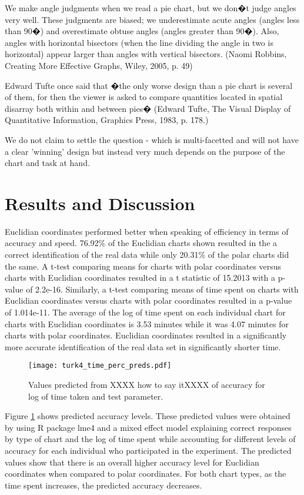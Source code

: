 	
	We make angle judgments when we read a pie chart, but we don�t judge angles very well. These judgments are biased; we underestimate acute angles (angles less than 90�) and overestimate obtuse angles (angles greater than 90�). Also, angles with horizontal bisectors (when the line dividing the angle in two is horizontal) appear larger than angles with vertical bisectors. (Naomi Robbins, Creating More Effective Graphs, Wiley, 2005, p. 49)
	
	 Edward Tufte once said that �the only worse design than a pie chart is several of them, for then the viewer is asked to compare quantities located in spatial disarray both within and between pies� (Edward Tufte, The Visual Display of Quantitative Information, Graphics Press, 1983, p. 178.)

 We do not claim to settle the question - which is multi-facetted and will not have a clear 'winning' design but instead very much depends on the purpose of the chart and task at hand.

\section{Results and Discussion}

Euclidian coordinates performed better when speaking of efficiency in terms of accuracy and speed. 76.92\% of the Euclidian charts shown resulted in the a correct identification of the real data while only 20.31\% of the polar charts did the same. A t-test comparing means for charts with polar coordinates versus charts with Euclidian coordinates resulted in a t statistic of 15.2013 with a p-value of 2.2e-16. Similarly, a t-test comparing means of time spent on charts with Euclidian coordinates versus charts with polar coordinates resulted in a p-value of 1.014e-11. The average of the log of time spent on each individual chart for charts with Euclidian coordinates is 3.53 minutes while it was 4.07 minutes for charts with polar coordinates. Euclidian coordinates resulted in a significantly more accurate identification of the real data set in significantly shorter time. 

\begin{figure}[htbp] %
   \centering
   \texttt{[image: turk4\_time\_perc\_preds.pdf]}  
   \caption{Values predicted from XXXX how to say itXXXX of accuracy for log of time taken and test parameter.}
   \label{accuracy_preds}
\end{figure}

Figure \ref{accuracy_preds} shows predicted accuracy levels. These predicted values were obtained by using R package lme4 and a mixed effect model explaining correct responses by type of chart and the log of time spent while accounting for different levels of accuracy for each individual who participated in the experiment. The predicted values show that there is an overall higher accuracy level for Euclidian coordinates when compared to polar coordinates. For both chart types, as the time spent increases, the predicted accuracy decreases. 



